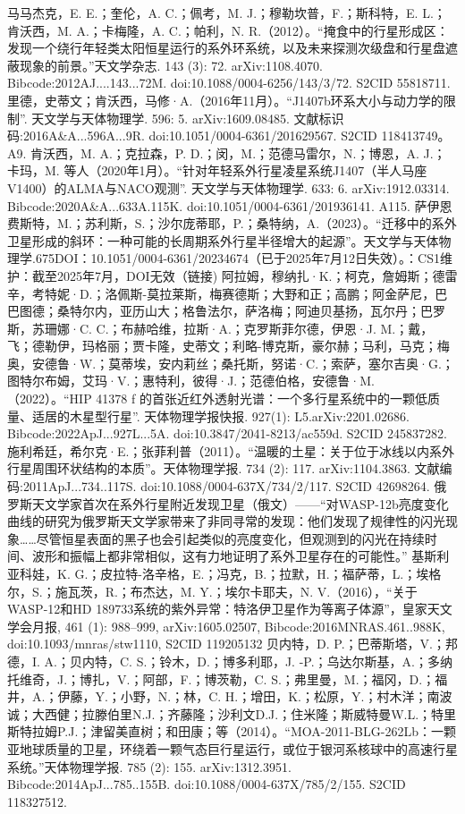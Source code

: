 \begin{enumerate}
 马马杰克，E. E.；奎伦，A. C.；佩考，M. J.；穆勒坎普，F.；斯科特，E. L.；肯沃西，M. A.；卡梅隆，A. C.；帕利，N. R.（2012）。“掩食中的行星形成区：发现一个绕行年轻类太阳恒星运行的系外环系统，以及未来探测次级盘和行星盘遮蔽现象的前景。”天文学杂志. 143 (3): 72. arXiv:1108.4070. Bibcode:2012AJ....143...72M. doi:10.1088/0004-6256/143/3/72. S2CID 55818711.
 里德，史蒂文；肯沃西，马修·A.（2016年11月）。“J1407b环系大小与动力学的限制”. 天文学与天体物理学. 596: 5. arXiv:1609.08485. 文献标识码:2016A&A...596A...9R. doi:10.1051/0004-6361/201629567. S2CID 118413749。A9.
 肯沃西，M. A.；克拉森，P. D.；闵，M.；范德马雷尔，N.；博恩，A. J.；卡玛，M. 等人（2020年1月）。“针对年轻系外行星凌星系统J1407（半人马座V1400）的ALMA与NACO观测”. 天文学与天体物理学. 633: 6. arXiv:1912.03314. Bibcode:2020A&A...633A.115K. doi:10.1051/0004-6361/201936141. A115.
 萨伊恩费斯特，M.；苏利斯，S.；沙尔庞蒂耶，P.；桑特纳，A.（2023）。“迁移中的系外卫星形成的斜环：一种可能的长周期系外行星半径增大的起源”。天文学与天体物理学.675DOI：10.1051/0004-6361/20234674（已于2025年7月12日失效）。：CS1维护：截至2025年7月，DOI无效（链接)
 阿拉姆，穆纳扎·K.；柯克，詹姆斯；德雷辛，考特妮·D.；洛佩斯-莫拉莱斯，梅赛德斯；大野和正；高鹏；阿金萨尼，巴巴图德；桑特尔内，亚历山大；格鲁法尔，萨洛梅；阿迪贝基扬，瓦尔丹；巴罗斯，苏珊娜·C. C.；布赫哈维，拉斯·A.；克罗斯菲尔德，伊恩·J. M.；戴，飞；德勒伊，玛格丽；贾卡隆，史蒂文；利略-博克斯，豪尔赫；马利，马克；梅奥，安德鲁·W.；莫蒂埃，安内莉丝；桑托斯，努诺·C.；索萨，塞尔吉奥·G.；图特尔布姆，艾玛·V.；惠特利，彼得·J.；范德伯格，安德鲁·M.（2022）。“HIP 41378 f 的首张近红外透射光谱：一个多行星系统中的一颗低质量、适居的木星型行星”. 天体物理学报快报. 927(1): L5.arXiv:2201.02686. Bibcode:2022ApJ...927L...5A. doi:10.3847/2041-8213/ac559d. S2CID 245837282.
 施利希廷，希尔克·E.；张菲利普（2011）。“温暖的土星：关于位于冰线以内系外行星周围环状结构的本质”。天体物理学报. 734 (2): 117. arXiv:1104.3863. 文献编码:2011ApJ...734..117S. doi:10.1088/0004-637X/734/2/117. S2CID 42698264.
 俄罗斯天文学家首次在系外行星附近发现卫星（俄文）——“对WASP-12b亮度变化曲线的研究为俄罗斯天文学家带来了非同寻常的发现：他们发现了规律性的闪光现象……尽管恒星表面的黑子也会引起类似的亮度变化，但观测到的闪光在持续时间、波形和振幅上都非常相似，这有力地证明了系外卫星存在的可能性。”
 基斯利亚科娃，K. G.；皮拉特-洛辛格，E.；冯克，B.；拉默，H.；福萨蒂，L.；埃格尔，S.；施瓦茨，R.；布杰达，M. Y.；埃尔卡耶夫，N. V.（2016），“关于WASP-12和HD 189733系统的紫外异常：特洛伊卫星作为等离子体源”，皇家天文学会月报, 461 (1): 988–999, arXiv:1605.02507, Bibcode:2016MNRAS.461..988K, doi:10.1093/mnras/stw1110, S2CID 119205132
 贝内特，D. P.；巴蒂斯塔，V.；邦德，I. A.；贝内特，C. S.；铃木，D.；博多利耶，J. -P.；乌达尔斯基，A.；多纳托维奇，J.；博扎，V.；阿部，F.；博茨勒，C. S.；弗里曼，M.；福冈，D.；福井，A.；伊藤，Y.；小野，N.；林，C. H.；增田，K.；松原，Y.；村木洋；南波诚；大西健；拉滕伯里N.J.；齐藤隆；沙利文D.J.；住米隆；斯威特曼W.L.；特里斯特拉姆P.J.；津留美直树；和田康；等（2014）。“MOA-2011-BLG-262Lb：一颗亚地球质量的卫星，环绕着一颗气态巨行星运行，或位于银河系核球中的高速行星系统。”天体物理学报. 785 (2): 155. arXiv:1312.3951. Bibcode:2014ApJ...785..155B. doi:10.1088/0004-637X/785/2/155. S2CID 118327512.

\end{enumerate}
